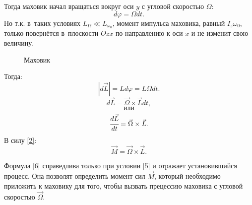 \documentclass[a4paper,12pt]{article}
\newcommand{\abs}[1]{\ensuremath{\left|#1\right|}} %
\theoremstyle{plain} %
\theoremstyle{definition} %
\theoremstyle{remark} %
\begin{document}
Тогда маховик начал вращаться вокруг оси $y$ с угловой скоростью $\Omega$:
$$d\varphi=\Omega dt.$$
Но т.к. в~таких условиях $L_\Omega \ll L_{\omega_0}$, момент импульса маховика, равный $I_z \omega_0$, только повернётся в~плоскости $Ozx$ по направлению к оси $x$ и не изменит свою величину.
\begin{figure}
	\begin{center}
		\caption{Маховик}
		\label{mah}
	\end{center}
\vspace{2cm}
\end{figure}
Тогда:
$$\abs{d \vec{L}} = Ld \varphi=L\Omega dt.$$
$$d \vec{L} = \vec{\Omega} \times \vec{L} dt,$$
$$\text{или}$$
$$\cfrac{d \vec{L}}{dt} = \vec{\Omega} \times \vec{L}.$$
В силу \eqref{2}:
\begin{equation}
\boxed{
\vec{M} = \vec{\Omega} \times \vec{L}}.
\label{6}
\end{equation}

Формула \eqref{6} справедлива только при условии \eqref{5} и отражает установившийся процесс. Она позволят определить момент сил $\vec{M}$, который необходимо приложить к маховику для того, чтобы вызвать прецессию маховика с угловой скоростью $\vec{\Omega}$.
\end{document}

